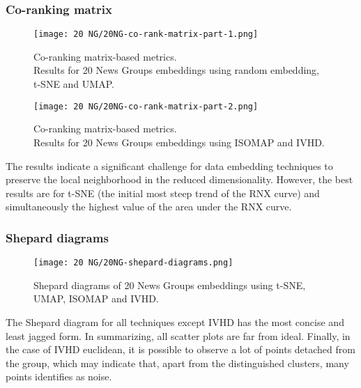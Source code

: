 \documentclass[12pt]{article}
\begin{document}
\clearpage
\subsubsection{Co-ranking matrix}
\begin{figure}[h]
    \centering
    \texttt{[image: 20 NG/20NG-co-rank-matrix-part-1.png]}
    \caption{Co-ranking matrix-based metrics. \\ Results for 20 News Groups embeddings using random embedding, t-SNE and UMAP.}
\end{figure}

\clearpage
\begin{figure}[h]
    \centering
    \texttt{[image: 20 NG/20NG-co-rank-matrix-part-2.png]}
    \caption{Co-ranking matrix-based metrics. \\ Results for 20 News Groups embeddings using ISOMAP and IVHD.}
\end{figure}
The results indicate a significant challenge for data embedding techniques to preserve the local neighborhood in the reduced dimensionality. However, the best results are for t-SNE (the initial most steep trend of the RNX curve) and simultaneously the highest value of the area under the RNX curve.

\clearpage
\subsubsection{Shepard diagrams}
\begin{figure}[h]
    \centering
    \texttt{[image: 20 NG/20NG-shepard-diagrams.png]}
    \caption{Shepard diagrams of 20 News Groups embeddings using t-SNE, UMAP, ISOMAP and IVHD.}
\end{figure}
The Shepard diagram for all techniques except IVHD has the most concise and least jagged form. In summarizing, all scatter plots are far from ideal. Finally, in the case of IVHD euclidean, it is possible to observe a lot of points detached from the group, which may indicate that, apart from the distinguished clusters, many points identifies as noise.

\clearpage
\end{document}
